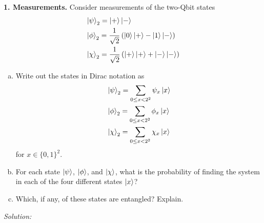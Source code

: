 \documentclass{book}
\theoremstyle{definition}
\newcommand{\nn}{\nonumber}
\newcommand{\f}[2]{\frac{#1}{#2}}
\newcommand{\lp}{\left(}
\newcommand{\rp}{\right)}
\begin{document}
\noindent \textbf{1. Measurements.} Consider measurements of the two-Qbit states
\begin{align}
&\ket{\psi}_2 = \ket{+}\ket{-}\nn\\
&\ket{\phi}_2 = \f{1}{\sqrt{2}}\lp \ket{0}\ket{+} - \ket{1}\ket{-} \rp\nn\\
&\ket{\chi}_2 = \f{1}{\sqrt{2}}\lp \ket{+}\ket{+} + \ket{-}\ket{-} \rp\nn
\end{align} 
\begin{enumerate}[(a)]
	\item Write out the states in Dirac notation as
	\begin{align}
	&\ket{\psi}_2 = \sum_{0\leq x < 2^2} \psi_x \ket{x} \nn\\
	&\ket{\phi}_2 = \sum_{0 \leq x < 2^2} \phi_x \ket{x}  \nn\\
	&\ket{\chi}_2 = \sum_{0 \leq x < 2^2} \chi_x \ket{x} \nn
	\end{align}
	for $x \in \{ 0,1\}^2$. 
	\item  For each state $\ket{\psi}$, $\ket{\phi}$, and $\ket{\chi}$, what is the probability of finding the system in each of
	the four different states $\ket{x}$?
	\item  Which, if any, of these states are entangled? Explain.

\end{enumerate}



\noindent \textit{Solution:} 
\end{document}
